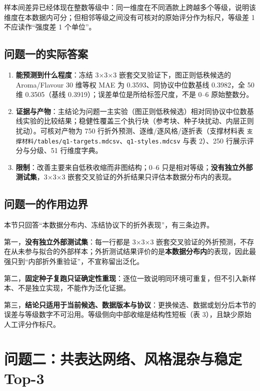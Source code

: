 \documentclass[11pt,a4paper]{article}
\providecommand{\tightlist}{%
  \setlength{\itemsep}{0pt}\setlength{\parskip}{0pt}}
\begin{document}
样本间差异已经体现在整数等级中：同一维度在不同酒款上跨越多个等级，说明该维度在本数据内可分；但相邻等级之间没有可核对的原始评分作为标尺，等级差
1 不应读作``强度差 1 个单位''。

\subsection{问题一的实际答案}\label{ux95eeux9898ux4e00ux7684ux5b9eux9645ux7b54ux6848}

\begin{enumerate}
\def\labelenumi{\arabic{enumi}.}
\tightlist
\item
  \textbf{能预测到什么程度}：冻结 3×3×3 嵌套交叉验证下，图正则低秩候选的
  Aroma/Flavour 30 维等权 MAE 为 0.3593、同协议中位数基线 0.3982，全 50
  维 0.3505（基线 0.3919）；误差单位是所给标签尺度，不是 0--6
  原始整数分。
\item
  \textbf{证据与产物}：主结论为问题一主实验（图正则低秩候选）相对同协议中位数基线实验的比较结果；稳健性覆盖三个执行块（参考块、种子块扰动、内层正则扰动）。可核对产物为
  750 行折外预测、逐维/逐风格/逐折表（支撑材料表
  \texttt{支撑材料/tables/q1-targets.md\textbar{}csv}、\texttt{q1-styles.md\textbar{}csv}
  与表 2）、250 行展示评分与分级、51 行维度字典。
\item
  \textbf{限制}：改善主要来自低秩收缩而非图结构；0--6
  只是相对等级；\textbf{没有独立外部测试集}，3×3×3
  嵌套交叉验证的外折结果只评估本数据分布内的表现。
\end{enumerate}

\subsection{问题一的作用边界}\label{ux95eeux9898ux4e00ux7684ux4f5cux7528ux8fb9ux754c}

本节只回答``本数据分布内、冻结协议下的折外表现''，有三条边界。

第一，\textbf{没有独立外部测试集}：每一行都是 3×3×3
嵌套交叉验证的外折预测，不存在从未参与拟合的外部样本；外折测试结果评价的是\textbf{本数据分布内}的表现，因此最强只到``内部折外重验证''，不宣称留出泛化。

第二，\textbf{固定种子复跑只证确定性重现}：逐位一致说明同环境可重复，但不引入新样本、不是独立实现，不能作为泛化证据。

第三，\textbf{结论只适用于当前候选、数据版本与协议}：更换候选、数据或划分后本节的误差与等级数字不可沿用。等级侧向中部收缩是结构性短板（表
3），且缺少原始人工评分作标尺。

\section{问题二：共表达网络、风格混杂与稳定
Top-3}\label{ux95eeux9898ux4e8cux5171ux8868ux8fbeux7f51ux7edcux98ceux683cux6df7ux6742ux4e0eux7a33ux5b9a-top-3}
\end{document}
